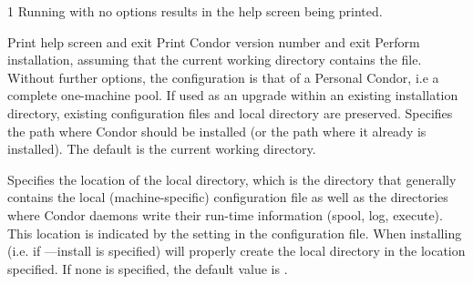 \begin{ManPage}{\label{man-condor-configure}}{1}
Running  with no options results in the
help screen being printed.

\begin{Options}
	 {Print help screen and exit}
	 {Print Condor version number and exit}
	 {Perform installation, assuming that
	the current working directory contains the 
	file.  Without further options, the configuration is that of
	a Personal Condor, i.e a complete one-machine pool.  If used as an 
	upgrade within an existing installation directory, existing 
	configuration files and local directory are preserved.}
	 {Specifies the path
	where Condor should be installed (or the path where it already is
	installed). The default is the current working directory.}
	 {Specifies the
	location of the local directory, which is the directory that generally 
	contains the local (machine-specific) configuration file as well as the
	directories where Condor daemons write their run-time information 
	(spool, log, execute). This location is indicated  by the  
	setting in the configuration file. 
	When installing (i.e. if ---install is specified)  
	will properly create the local directory in the location specified. If
	none is specified, the default value is 
.

}
\end{Options}
\end{ManPage}
